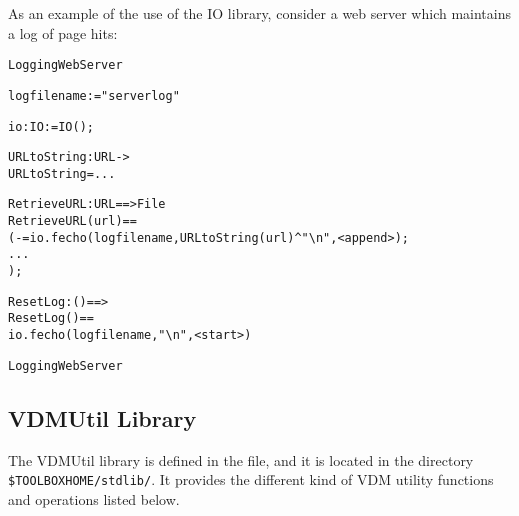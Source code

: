 \documentclass[\pformat,12pt]{article}
\begin{document}
As an example of the use of the IO library, consider a
web server which maintains a log of page hits:
\begin{alltt}
   LoggingWebServer

      logfilename :  = "serverlog"

      io : IO :=  IO();

      URLtoString : URL -> 
      URLtoString = ...

      RetrieveURL : URL ==> File
      RetrieveURL(url) ==
        ( - = io.fecho(logfilename, URLtoString(url)^\verb+"\n"+, <append>);
         ... 
        );

      ResetLog : () ==> 
      ResetLog() ==
        io.fecho(logfilename,\verb+"\n"+,<start>)

   LoggingWebServer
\end{alltt}


\subsection{VDMUtil Library}

The VDMUtil library is defined in the 
 file, and it 
is located 
in the directory \verb+$TOOLBOXHOME/stdlib/+.  
It provides the different kind of VDM utility functions and 
operations listed below. 
\end{document}
